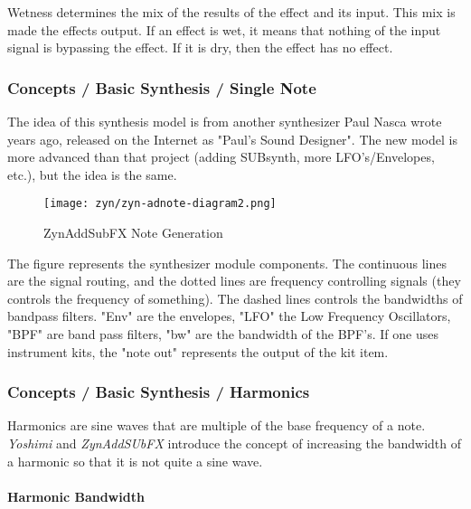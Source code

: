    Wetness determines the mix of the results of the effect and its input.
   This mix is made the effects output. If an effect is wet, it means that
   nothing of the input signal is bypassing the effect. If it is dry, then
   the effect has no effect.

\subsubsection{Concepts / Basic Synthesis / Single Note}
\label{subsubsec:concepts_basics_single_note}

   The idea of this synthesis model is from another synthesizer Paul Nasca
   wrote years ago, released on the Internet as "Paul's Sound
   Designer".  The new model is more advanced than that project
   (adding SUBsynth, more LFO's/Envelopes, etc.), but the idea is
   the same.

\begin{figure}[H]
   \centering 
   \texttt{[image: zyn/zyn-adnote-diagram2.png]}
   \caption{ZynAddSubFX Note Generation}
   \label{fig:zynaddsubfx_note_generation}
\end{figure}
   
   The figure represents the synthesizer module components. The continuous
   lines are the signal routing, and the dotted lines are frequency
   controlling signals (they controls the frequency of something).  The
   dashed lines controls the bandwidths of bandpass filters. "Env" are the
   envelopes, "LFO" the Low Frequency Oscillators, "BPF" are band pass
   filters, "bw" are the bandwidth of the BPF's.  If one uses instrument kits,
   the "note out" represents the output of the kit item.

\subsubsection{Concepts / Basic Synthesis / Harmonics}
\label{subsubsec:concepts_basics_harmonics}

   Harmonics are sine waves that are multiple of the base frequency of a
   note.  \textsl{Yoshimi} and \textsl{ZynAddSUbFX} introduce the concept of
   increasing the bandwidth of a harmonic so that it is not quite a sine
   wave.

\paragraph{Harmonic Bandwidth}
\label{paragraph:concepts_basics_harmonic_bandwidth}

